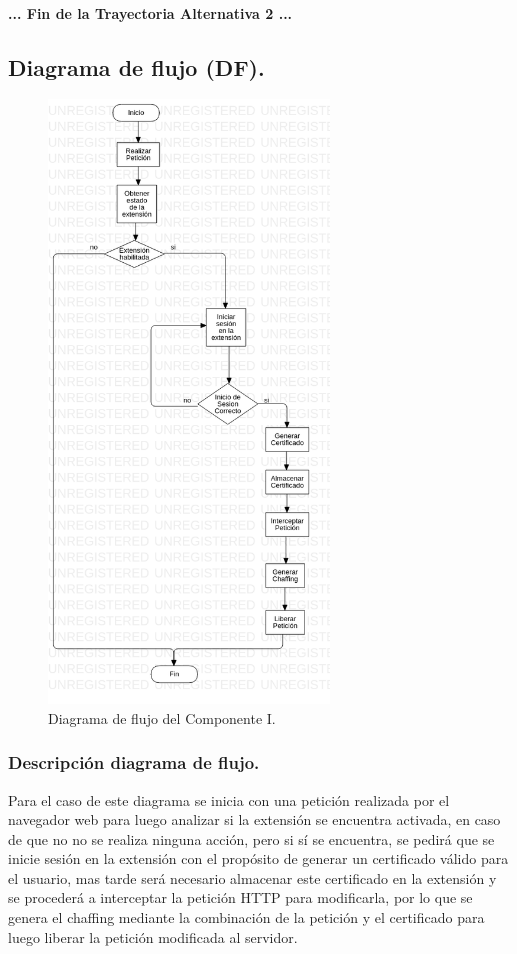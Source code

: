 \documentclass[12pt, a4paper, titlepage]{report}
\begin{document}
				\paragraph{... Fin de la Trayectoria Alternativa 2 ...}
				
				\newpage
		
			\subsection{Diagrama de flujo (DF).}
			    
			    \begin{figure}[H]
					\begin{center}			    	\includegraphics[height=16cm]{./imagenes/Disenio/Componente_1/CI_DF.png}
						\caption{Diagrama de flujo del Componente I.}
					\end{center}
				\end{figure}
				
			    \subsubsection{Descripción diagrama de flujo.}
			        Para el caso de este diagrama se inicia con una petición realizada por el navegador web para luego analizar si la extensión se encuentra activada, en caso de que no no se realiza ninguna acción, pero si sí se encuentra, se pedirá que se inicie sesión en la extensión con el propósito de generar un certificado válido para el usuario, mas tarde será necesario almacenar este certificado en la extensión y se procederá a interceptar la petición HTTP para modificarla, por lo que se genera el chaffing mediante la combinación de la petición y el certificado para luego liberar la petición modificada al servidor.
				
\end{document}
